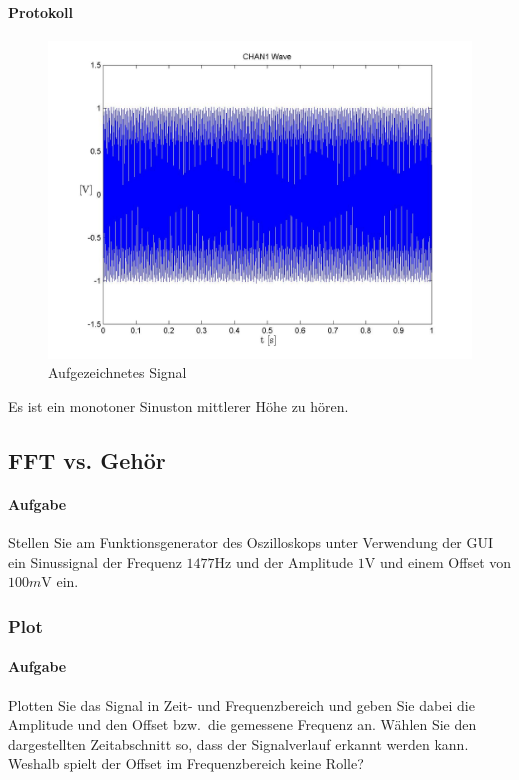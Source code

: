 \documentclass[10pt]{report}
\begin{document}
        \paragraph{Protokoll}
        \begin{center}
            \begin{figure}[H]
                \includegraphics[width=\textwidth]{Screenshot_GUI_4112_Wave_chan1_wave.jpg}
              \caption{Aufgezeichnetes Signal}
            \end{figure}
        \end{center}

        Es ist ein monotoner Sinuston mittlerer Höhe zu hören.

        \subsection{FFT vs. Gehör}
        \paragraph{Aufgabe}
        Stellen Sie am Funktionsgenerator des Oszilloskops unter Verwendung der GUI ein Sinussignal
        der Frequenz $1477\si{\hertz}$ und der Amplitude $1\si{\volt}$ und einem Offset von $100\si{m\volt}$
        ein.

        \subsubsection{Plot}
        \paragraph{Aufgabe}
        Plotten Sie das Signal in Zeit- und Frequenzbereich und geben Sie dabei die Amplitude
        und den Offset bzw.\ die gemessene Frequenz an. Wählen Sie den dargestellten
        Zeitabschnitt so, dass der Signalverlauf erkannt werden kann. Weshalb spielt der
        Offset im Frequenzbereich keine Rolle?
\end{document}
